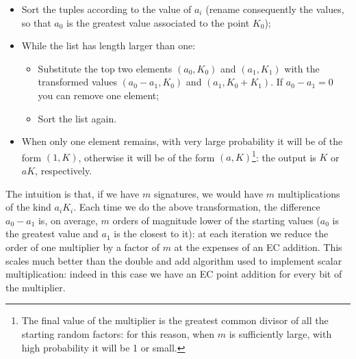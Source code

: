 \begin{itemize}
	\item Sort the tuples according to the value of $a_i$ (rename consequently the values, so that $a_0$ is the greatest value associated to the point $K_0$);
	\item While the list has length larger than one:
	\begin{itemize}
		\item Substitute the top two elements $(a_0, K_0)$ and $(a_1, K_1)$ with the transformed values $(a_0 - a_1, K_0)$ and $(a_1, K_0 + K_1)$. If $a_0 - a_1 = 0$ you can remove one element;
		\item Sort the list again.
	\end{itemize}
\item When only one element remains, with very large probability it will be of the form $(1, K)$, otherwise it will be of the form $(a, K)$\footnote{The final value of the multiplier is the greatest common divisor of all the starting random factors: for this reason, when $m$ is sufficiently large, with high probability it will be 1 or small.}: the output is $K$ or $aK$, respectively.
\end{itemize}
The intuition is that, if we have $m$ signatures, we would have $m$ multiplications of the kind $a_iK_i$. Each time we do the above transformation, the difference $a_0 - a_1$ is, on average, $m$ orders of magnitude lower of the starting values ($a_0$ is the greatest value and $a_1$ is the closest to it): at each iteration we reduce the order of one multiplier by a factor of $m$ at the expenses of an EC addition. This scales much better than the double and add algorithm used to implement scalar multiplication: indeed in this case we have an EC point addition for every bit of the multiplier.

